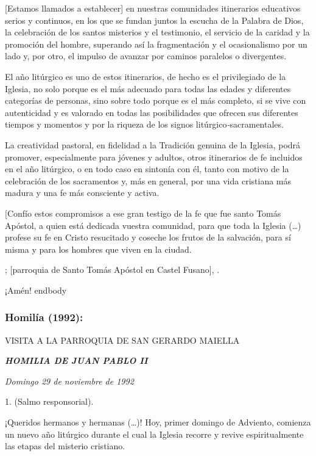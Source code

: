 \begin{body}
	{[}Estamos llamados a establecer{]} en nuestras comunidades itinerarios educativos serios y continuos, en los que se fundan juntos la escucha de la Palabra de Dios, la celebración de los santos misterios y el testimonio, el servicio de la caridad y la promoción del hombre, superando así la fragmentación y el ocasionalismo por un lado y, por otro, el impulso de avanzar por caminos paralelos o divergentes.

	El año litúrgico es uno de estos itinerarios, de hecho es el privilegiado de la Iglesia, no solo porque es el más adecuado para todas las edades y diferentes categorías de personas, sino sobre todo porque es el más completo, si se vive con autenticidad y es valorado en todas las posibilidades que ofrecen sus diferentes tiempos y momentos y por la riqueza de los signos litúrgico\emph{-}sacramentales.

	La creatividad pastoral, en fidelidad a la Tradición genuina de la Iglesia, podrá promover, especialmente para jóvenes y adultos, otros itinerarios de fe incluidos en el año litúrgico, o en todo caso en sintonía con él, tanto con motivo de la celebración de los sacramentos y, más en general, por una vida cristiana más madura y una fe más consciente y activa.

	{[}Confío estos compromisos a ese gran testigo de la fe que fue santo Tomás Apóstol, a quien está dedicada vuestra comunidad, para que toda la Iglesia (\ldots{}) profese su fe en Cristo resucitado y coseche los frutos de la salvación, para sí misma y para los hombres que viven en la ciudad.

	; {[}parroquia de Santo Tomás Apóstol en Castel Fusano{]}, .

	¡Amén!
	end{body}

	\subsubsection{Homilía (1992):}

	VISITA A LA PARROQUIA DE SAN GERARDO MAIELLA

	\emph{\textbf{HOMILIA DE JUAN PABLO II}}

	\emph{Domingo 29 de noviembre de 1992}

	\begin{body}
		1.  (Salmo responsorial).

		¡Queridos hermanos y hermanas (\ldots{})! Hoy, primer domingo de Adviento, comienza un nuevo año litúrgico durante el cual la Iglesia recorre y revive espiritualmente las etapas del misterio cristiano.


\end{body}
\end{body}
